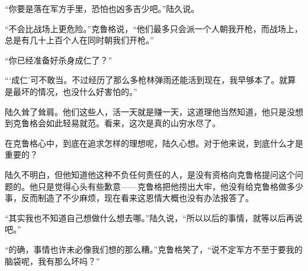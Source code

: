 “你要是落在军方手里，恐怕也凶多吉少吧。”陆久说。

“不会比战场上更危险。”克鲁格说，“他们最多只会派一个人朝我开枪，而战场上，总是有几十上百个人在同时朝我们开枪。”

“你已经准备好杀身成仁了？”

“‘成仁’可不敢当。不过经历了那么多枪林弹雨还能活到现在，我早够本了。就算是最坏的情况，也没什么好害怕的。”

陆久耸了耸肩。他们这些人，活一天就是赚一天，这道理他当然知道，他只是没想到克鲁格会如此轻易就范。看来，这次是真的山穷水尽了。

在克鲁格心中，到底在追求怎样的理想呢，陆久心想。对于他来说，到底什么才是重要的？

陆久不明白，但他知道他这种不负任何责任的人，是没有资格向克鲁格提问这个问题的。他只是觉得心头有些歉意——克鲁格把他捞出大牢，他没有给克鲁格做多少事，反而制造了不少麻烦，现在看来这恩情大概也没有办法报答了。

“其实我也不知道自己想做什么想去哪。”陆久说，“所以以后的事情，就等以后再说吧。”

“的确，事情也许未必像我们想的那么糟。”克鲁格笑了，“说不定军方不至于要我的脑袋呢，我有那么坏吗？”

